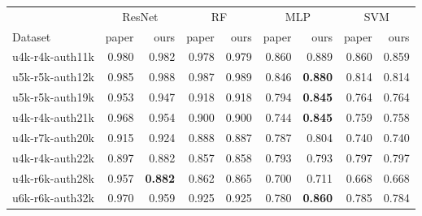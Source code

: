 \begin{tabular}{lrrrrrrrr}
\toprule
 & \multicolumn{2}{c}{ResNet} & \multicolumn{2}{c}{RF} & \multicolumn{2}{c}{MLP} & \multicolumn{2}{c}{SVM} \\
Dataset & paper & ours & paper & ours & paper & ours & paper & ours \\
\midrule
u4k-r4k-auth11k & 0.980 & 0.982 & 0.978 & 0.979 & 0.860 & 0.889 & 0.860 & 0.859 \\
u5k-r5k-auth12k & 0.985 & 0.988 & 0.987 & 0.989 & 0.846 & \textbf{0.880} & 0.814 & 0.814 \\
u5k-r5k-auth19k & 0.953 & 0.947 & 0.918 & 0.918 & 0.794 & \textbf{0.845} & 0.764 & 0.764 \\
u4k-r4k-auth21k & 0.968 & 0.954 & 0.900 & 0.900 & 0.744 & \textbf{0.845} & 0.759 & 0.758 \\
u4k-r7k-auth20k & 0.915 & 0.924 & 0.888 & 0.887 & 0.787 & 0.804 & 0.740 & 0.740 \\
u4k-r4k-auth22k & 0.897 & 0.882 & 0.857 & 0.858 & 0.793 & 0.793 & 0.797 & 0.797 \\
u4k-r6k-auth28k & 0.957 & \textbf{0.882} & 0.862 & 0.865 & 0.700 & 0.711 & 0.668 & 0.668 \\
u6k-r6k-auth32k & 0.970 & 0.959 & 0.925 & 0.925 & 0.780 & \textbf{0.860} & 0.785 & 0.784 \\
\bottomrule
\end{tabular}
